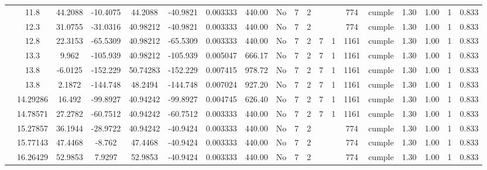 \begin{table}[H]
{\begin{tabular}{|c|c|c|c|c|c|r|c|c|c|c|c|c|c|c|c|c|c|c|}
\cline{2-19}    & 11.8 & 44.2088 & -10.4075 & 44.2088 & -40.9821 & 0.003333 & 440.00 & No  & 7   & 2   &     &     & 774 & \cellcolor[rgb]{ .776,  .937,  .808}cumple & 1.30 & 1.00 & 1   & 0.833 \bigstrut\\
\cline{2-19}    & 12.3 & 31.0755 & -31.0316 & 40.98212 & -40.9821 & 0.003333 & 440.00 & No  & 7   & 2   &     &     & 774 & \cellcolor[rgb]{ .776,  .937,  .808}cumple & 1.30 & 1.00 & 1   & 0.833 \bigstrut\\
\cline{2-19}    & 12.8 & 22.3153 & -65.5309 & 40.98212 & -65.5309 & 0.003333 & 440.00 & No  & 7   & 2   & 7   & 1   & 1161 & \cellcolor[rgb]{ .776,  .937,  .808}cumple & 1.30 & 1.00 & 1   & 0.833 \bigstrut\\
\cline{2-19}    & 13.3 & 9.962 & -105.939 & 40.98212 & -105.939 & 0.005047 & 666.17 & No  & 7   & 2   & 7   & 1   & 1161 & \cellcolor[rgb]{ .776,  .937,  .808}cumple & 1.30 & 1.00 & 1   & 0.833 \bigstrut\\
\cline{2-19}    & \cellcolor[rgb]{ .851,  .882,  .949}13.8 & -6.0125 & -152.229 & 50.74283 & -152.229 & 0.007415 & 978.72 & No  & 7   & 2   & 7   & 1   & 1161 & \cellcolor[rgb]{ .776,  .937,  .808}cumple & 1.30 & 1.00 & 1   & 0.833 \bigstrut\\
\cline{2-19}    & \cellcolor[rgb]{ .851,  .882,  .949}13.8 & 2.1872 & -144.748 & 48.2494 & -144.748 & 0.007024 & 927.20 & No  & 7   & 2   & 7   & 1   & 1161 & \cellcolor[rgb]{ .776,  .937,  .808}cumple & 1.30 & 1.00 & 1   & 0.833 \bigstrut\\
\cline{2-19}    & 14.29286 & 16.492 & -99.8927 & 40.94242 & -99.8927 & 0.004745 & 626.40 & No  & 7   & 2   & 7   & 1   & 1161 & \cellcolor[rgb]{ .776,  .937,  .808}cumple & 1.30 & 1.00 & 1   & 0.833 \bigstrut\\
\cline{2-19}    & 14.78571 & 27.2782 & -60.7512 & 40.94242 & -60.7512 & 0.003333 & 440.00 & No  & 7   & 2   & 7   & 1   & 1161 & \cellcolor[rgb]{ .776,  .937,  .808}cumple & 1.30 & 1.00 & 1   & 0.833 \bigstrut\\
\cline{2-19}    & 15.27857 & 36.1944 & -28.9722 & 40.94242 & -40.9424 & 0.003333 & 440.00 & No  & 7   & 2   &     &     & 774 & \cellcolor[rgb]{ .776,  .937,  .808}cumple & 1.30 & 1.00 & 1   & 0.833 \bigstrut\\
\cline{2-19}    & 15.77143 & 47.4468 & -8.762 & 47.4468 & -40.9424 & 0.003333 & 440.00 & No  & 7   & 2   &     &     & 774 & \cellcolor[rgb]{ .776,  .937,  .808}cumple & 1.30 & 1.00 & 1   & 0.833 \bigstrut\\
\cline{2-19}    & 16.26429 & 52.9853 & 7.9297 & 52.9853 & -40.9424 & 0.003333 & 440.00 & No  & 7   & 2   &     &     & 774 & \cellcolor[rgb]{ .776,  .937,  .808}cumple & 1.30 & 1.00 & 1   & 0.833 \bigstrut\\

\end{tabular}}
\end{table}

